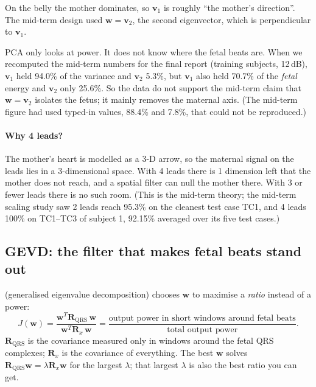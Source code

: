 \documentclass[11pt]{article}
\begin{document}
On the belly the mother dominates, so $\mathbf{v}_1$ is roughly ``the mother's direction''. The mid-term design used $\mathbf{w} = \mathbf{v}_2$, the second eigenvector, which is perpendicular to $\mathbf{v}_1$.

\begin{warn}
PCA only looks at power. It does not know where the fetal beats are. When we recomputed the mid-term numbers for the final report (training subjects, 12\,dB), $\mathbf{v}_1$ held 94.0\% of the variance and $\mathbf{v}_2$ 5.3\%, but $\mathbf{v}_1$ also held 70.7\% of the \emph{fetal} energy and $\mathbf{v}_2$ only 25.6\%. So the data do not support the mid-term claim that $\mathbf{w} = \mathbf{v}_2$ isolates the fetus; it mainly removes the maternal axis. (The mid-term figure had used typed-in values, 88.4\% and 7.8\%, that could not be reproduced.)
\end{warn}

\paragraph{Why 4 leads?} The mother's heart is modelled as a 3-D arrow, so the maternal signal on the leads lies in a 3-dimensional space. With 4 leads there is 1 dimension left that the mother does not reach, and a spatial filter can null the mother there. With 3 or fewer leads there is no such room. (This is the mid-term theory; the mid-term scaling study saw 2 leads reach 95.3\% on the cleanest test case TC1, and 4 leads 100\% on TC1--TC3 of subject 1, 92.15\% averaged over its five test cases.)

\subsection{GEVD: the filter that makes fetal beats stand out}
\label{sec:gevd}
 (generalised eigenvalue decomposition) chooses $\mathbf{w}$ to maximise a \emph{ratio} instead of a power:
\[
J(\mathbf{w}) = \frac{\mathbf{w}^T\mathbf{R}_{\text{QRS}}\,\mathbf{w}}{\mathbf{w}^T\mathbf{R}_x\,\mathbf{w}} = \frac{\text{output power in short windows around fetal beats}}{\text{total output power}}.
\]
$\mathbf{R}_{\text{QRS}}$ is the covariance measured only in windows around the fetal QRS complexes; $\mathbf{R}_x$ is the covariance of everything. The best $\mathbf{w}$ solves $\mathbf{R}_{\text{QRS}}\mathbf{w} = \lambda\mathbf{R}_x\mathbf{w}$ for the largest $\lambda$; that largest $\lambda$ is also the best ratio you can get.
\end{document}
